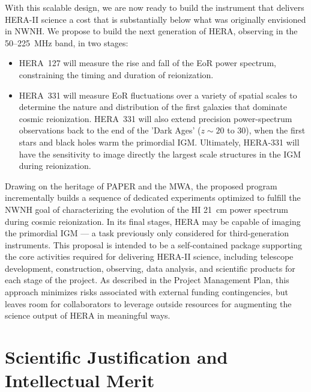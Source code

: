 \documentclass[preprint]{aastex}
\begin{document}
With this scalable design, we are now ready to build the instrument
that delivers HERA-II science
a cost that is substantially below what was originally envisioned in NWNH.
We propose to build the next generation of HERA,
observing in the 50--225~MHz band, in two stages:
\begin{itemize}[noitemsep,nolistsep]

\item HERA~127 will measure the rise and fall of the EoR power
spectrum, constraining the timing and duration of reionization.

\item HERA~331 will measure EoR fluctuations over a variety of spatial
scales to determine the nature and distribution of the first galaxies
that dominate cosmic reionization. HERA~331 will also extend precision
power-spectrum observations back to the end of the 'Dark Ages' ($z \sim 20$
to 30), when the first stars and black holes warm the primordial IGM. Ultimately,
HERA-331 will have the sensitivity to
image directly the largest scale structures in the IGM during reionization.
\end{itemize}
Drawing on the heritage of PAPER and the MWA, the proposed program incrementally builds a 
sequence of dedicated experiments
optimized to fulfill the NWNH goal of characterizing the evolution of
the HI 21~cm power spectrum during cosmic reionization. In
its final stages, HERA may be capable of imaging the primordial
IGM --- a task previously only considered for third-generation
instruments. This proposal is intended to be a self-contained package
supporting the core activities required for delivering HERA-II science,
including telescope development, construction, observing, data analysis,
and scientific products for each stage of the project.  As described
in the Project Management Plan, this approach minimizes
risks associated with external funding contingencies, but leaves room for
collaborators to leverage outside resources for augmenting the science
output of HERA in meaningful ways.



\section{Scientific Justification and Intellectual Merit} %
\end{document}
